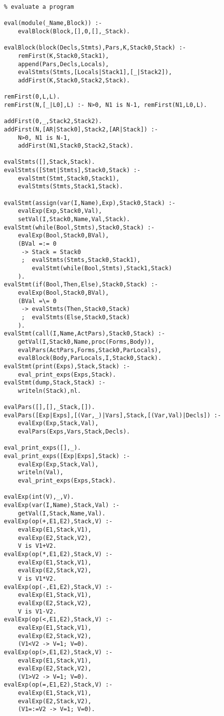 \begin{verbatim}
% evaluate a program

eval(module(_Name,Block)) :-
	evalBlock(Block,[],0,[],_Stack).

evalBlock(block(Decls,Stmts),Pars,K,Stack0,Stack) :-
	remFirst(K,Stack0,Stack1),
	append(Pars,Decls,Locals),
	evalStmts(Stmts,[Locals|Stack1],[_|Stack2]),
	addFirst(K,Stack0,Stack2,Stack).

remFirst(0,L,L).
remFirst(N,[_|L0],L) :- N>0, N1 is N-1, remFirst(N1,L0,L).

addFirst(0,_,Stack2,Stack2).
addFirst(N,[AR|Stack0],Stack2,[AR|Stack]) :- 
	N>0, N1 is N-1,
	addFirst(N1,Stack0,Stack2,Stack).

evalStmts([],Stack,Stack).
evalStmts([Stmt|Stmts],Stack0,Stack) :-
	evalStmt(Stmt,Stack0,Stack1),
	evalStmts(Stmts,Stack1,Stack).

evalStmt(assign(var(I,Name),Exp),Stack0,Stack) :-
	evalExp(Exp,Stack0,Val),
	setVal(I,Stack0,Name,Val,Stack).
evalStmt(while(Bool,Stmts),Stack0,Stack) :-
	evalExp(Bool,Stack0,BVal),
	(BVal =:= 0
	 ->	Stack = Stack0
	 ;	evalStmts(Stmts,Stack0,Stack1),
		evalStmt(while(Bool,Stmts),Stack1,Stack)
	).
evalStmt(if(Bool,Then,Else),Stack0,Stack) :-
	evalExp(Bool,Stack0,BVal),
	(BVal =\= 0
	 ->	evalStmts(Then,Stack0,Stack)
	 ;	evalStmts(Else,Stack0,Stack)
	).
evalStmt(call(I,Name,ActPars),Stack0,Stack) :-
	getVal(I,Stack0,Name,proc(Forms,Body)),
	evalPars(ActPars,Forms,Stack0,ParLocals),
	evalBlock(Body,ParLocals,I,Stack0,Stack).
evalStmt(print(Exps),Stack,Stack) :-
	eval_print_exps(Exps,Stack).
evalStmt(dump,Stack,Stack) :-
	writeln(Stack),nl.

evalPars([],[],_Stack,[]).
evalPars([Exp|Exps],[(Var,_)|Vars],Stack,[(Var,Val)|Decls]) :-
	evalExp(Exp,Stack,Val),
	evalPars(Exps,Vars,Stack,Decls).

eval_print_exps([],_).
eval_print_exps([Exp|Exps],Stack) :-
	evalExp(Exp,Stack,Val),
	writeln(Val),
	eval_print_exps(Exps,Stack).

evalExp(int(V),_,V).
evalExp(var(I,Name),Stack,Val) :-
	getVal(I,Stack,Name,Val).
evalExp(op(+,E1,E2),Stack,V) :-
	evalExp(E1,Stack,V1),
	evalExp(E2,Stack,V2),
	V is V1+V2.
evalExp(op(*,E1,E2),Stack,V) :-
	evalExp(E1,Stack,V1),
	evalExp(E2,Stack,V2),
	V is V1*V2.
evalExp(op(-,E1,E2),Stack,V) :-
	evalExp(E1,Stack,V1),
	evalExp(E2,Stack,V2),
	V is V1-V2.
evalExp(op(<,E1,E2),Stack,V) :-
	evalExp(E1,Stack,V1),
	evalExp(E2,Stack,V2),
	(V1<V2 -> V=1; V=0).
evalExp(op(>,E1,E2),Stack,V) :-
	evalExp(E1,Stack,V1),
	evalExp(E2,Stack,V2),
	(V1>V2 -> V=1; V=0).
evalExp(op(=,E1,E2),Stack,V) :-
	evalExp(E1,Stack,V1),
	evalExp(E2,Stack,V2),
	(V1=:=V2 -> V=1; V=0).

\end{verbatim}



